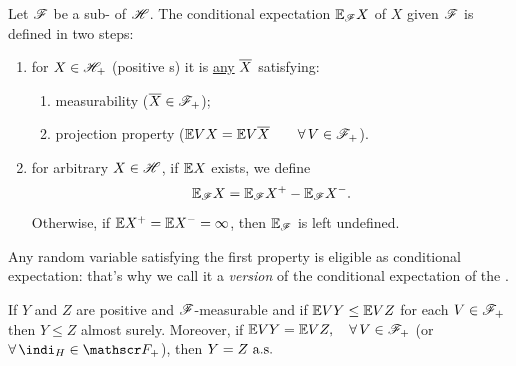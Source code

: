 \documentclass{report}
\begin{document}
\begin{definition}
	Let $\mathscr{F}$ be a sub-\sa{} of $\mathscr{H}$. The conditional expectation $\mathbb{E}_{\mathscr{F}} X$ of $X$ given $\mathscr{F}$ is defined in two steps:
	\begin{enumerate}[\circlet]
		\item for $X\in\mathscr{H}_{+}$ (positive \rv s) it is \underline{any} \rv{} $\overline{X}$ satisfying:
		\begin{enumerate}
			\item measurability ($\overline{X}\in\mathscr{F}_+$);
			\item projection property ($\mathbb{E} VX=\mathbb{E} V\overline{X}\qquad\forall\, V\in\mathscr{F}_+$).
		\end{enumerate}
		\item for arbitrary $X\in\mathscr{H}$, if $\mathbb{E} X$ exists, we define
		\[\mathbb{E}_{\mathscr{F}}X=\mathbb{E}_{\mathscr{F}}X^{+}-\mathbb{E}_{\mathscr{F}}X^{-}.\]
		Otherwise, if $\mathbb{E} X^{+}=\mathbb{E} X^{-}=\infty$, then $\mathbb{E}_{\mathscr{F}}$ is left undefined.
	\end{enumerate}
\end{definition}
Any random variable satisfying the first property is eligible as conditional expectation: that's why we call it a \emph{version} of the conditional expectation of the \rv.
\begin{revise}
	If $Y$ and $Z$ are positive and $\mathscr{F}$-measurable and if $\mathbb{E} VY\leq\mathbb{E} VZ$ for each $V\in\mathscr{F}_+$ then $Y\leq Z$ almost surely. Moreover, if $\mathbb{E} VY=\mathbb{E} VZ,\quad\forall\, V\in\mathscr{F}_+$ (or $\every \indi_H\in\F_+$), then $Y=Z\text{ a.s.}$ 
\end{revise}
\end{document}
